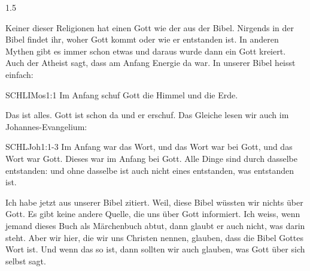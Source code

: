 \documentclass[fontsize=14pt]{../../inc/mybib}
\begin{document}
\begin{spacing}{1.5}
\begin{block}
        Keiner dieser Religionen hat einen Gott wie der aus der Bibel. Nirgends in der Bibel findet ihr, woher Gott kommt oder wie er entstanden ist. In anderen Mythen gibt es immer schon etwas und daraus wurde dann ein Gott kreiert. Auch der Atheist sagt, dass am Anfang Energie da war. In unserer Bibel heisst einfach:
        \begin{bibelbox}{SCHL}{IMos}{1:1}
            Im Anfang schuf Gott die Himmel und die Erde.
        \end{bibelbox}
        Das ist alles. Gott ist schon da und er erschuf. Das Gleiche lesen wir auch im Johannes-Evangelium:
        \begin{bibelbox}{SCHL}{Joh}{1:1-3}
            Im Anfang war das Wort, und das Wort war bei Gott, und das Wort war Gott. Dieses war im Anfang bei Gott. Alle Dinge sind durch dasselbe entstanden: und ohne dasselbe ist auch nicht eines entstanden, was entstanden ist.
        \end{bibelbox}
        Ich habe jetzt aus unserer Bibel zitiert. Weil,  diese Bibel wüssten wir nichts über Gott. Es gibt keine andere Quelle, die uns über Gott informiert. Ich weiss, wenn jemand dieses Buch als Märchenbuch abtut, dann glaubt er auch nicht, was darin steht. Aber wir hier, die wir uns Christen nennen, glauben, dass die Bibel Gottes Wort ist. Und wenn das so ist, dann sollten wir auch glauben, was Gott über sich selbst sagt.


\end{block}
\end{spacing}
\end{document}
